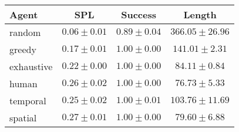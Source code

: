 \begin{tabular}{lccc}
    \toprule
    Agent & SPL & Success & Length \\
    \midrule
    random & $0.06 \pm 0.01$ & $0.89 \pm 0.04$ & $366.05 \pm 26.96$\\
    greedy & $0.17 \pm 0.01$ & $1.00 \pm 0.00$ & $141.01 \pm 2.31$\\
    exhaustive & $0.22 \pm 0.00$ & $1.00 \pm 0.00$ & $84.11 \pm 0.84$\\
    human & $0.26 \pm 0.02$ & $1.00 \pm 0.00$ & $76.73 \pm 5.33$\\
    \midrule
    temporal & $0.25 \pm 0.02$ & $1.00 \pm 0.01$ & $103.76 \pm 11.69$\\
    spatial & $0.27 \pm 0.01$ & $1.00 \pm 0.00$ & $79.60 \pm 6.88$\\
    \bottomrule
\end{tabular}